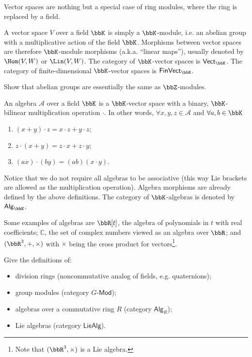 Vector spaces are nothing but a special case of ring modules, where
the ring is replaced by a field.
\begin{defn}
    A vector space $V$ over a field $\bbK$ is simply a $\bbK$-module, i.e.
    an abelian group with a multiplicative action of the field $\bbK$. Morphisms
    between vector spaces are therefore $\bbK$-module morphisms (a.k.a.
    ``linear maps''), usually denoted by $\Hom(V,W)$ or $\Lin(V,W)$. The category of $\bbK$-vector spaces is $\mathsf{Vect}_{\bbK}$.
    The category of finite-dimensional $\bbK$-vector spaces is $\mathsf{FinVect}_{\bbK}$.
\end{defn}
\begin{xca}
    Show that abelian groups are essentially the same as $\bbZ$-modules.
\end{xca}
\begin{defn}
    An algebra $\mathcal{A}$ over a field $\bbK$ is a $\bbK$-vector space
    with a binary, $\bbK$-bilinear multiplication operation $\cdot$. In
    other words, $\forall x,y,z\in\mathcal{A}$ and $\forall a,b\in \bbK$ 
    \begin{enumerate}
        \item $(x+y)\cdot z=x\cdot z+y\cdot z$;
        \item $z\cdot(x+y)=z\cdot x+z\cdot y$;
        \item $(ax)\cdot(by)=(ab)(x\cdot y)$.
    \end{enumerate}
\end{defn}
Notice that we do not require all algebras to be associative (this
way Lie brackets are allowed as the multiplication operation). Algebra
morphisms are already defined by the above definitions. The category
of $\bbK$-algebras is denoted by $\mathsf{Alg}_{\bbK}$.
\begin{example}
    Some examples of algebras are $\bbR [t]$, the algebra of polynomials
    in $t$ with real coefficients; $\mathbb{C}$, the set of complex
    numbers viewed as an algebra over $\bbR $; and $(\bbR^{3},+,\times)$
    with $\times$ being the cross product for vectors\footnote{Note that $(\bbR^{3},\times)$ is a Lie algebra.}.
\end{example}
\begin{xca}
    Give the definitions of:
    \begin{itemize}
        \item division rings (noncommutative analog of fields, e.g. quaternions);
        \item group modules (category $G\text{-}\mathsf{Mod}$);
        \item algebras over a commutative ring $R$ (category $\mathsf{Alg}_{R}$);
        \item Lie algebras (category $\mathsf{LieAlg}$).
    \end{itemize}
\end{xca}


